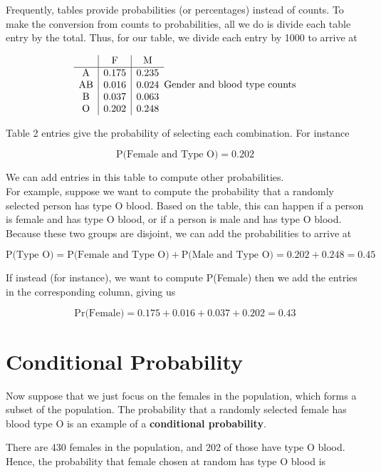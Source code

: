 \documentclass[
]{book}
\begin{document}
Frequently, tables provide probabilities (or percentages) instead of counts.
To make the conversion from counts to probabilities, all we do is divide each table entry by the total.
Thus, for our table, we divide each entry by 1000 to arrive at

\[
\begin{array}{c|c|c}
           & \mathrm{F} & \mathrm{M}\\ \hline
\mathrm{A} & 0.175 & 0.235 \\ 
\mathrm{AB} & 0.016 & 0.024 \\ 
\mathrm{B} & 0.037 & 0.063 \\ 
\mathrm{O} & 0.202 & 0.248 \\ 
\end{array}\\
\mbox{Gender and blood type counts}
\]

Table 2 entries give the probability of selecting each combination. For instance

\[
\mbox{P(Female and Type O)} = 0.202
\]

We can add entries in this table to compute other probabilities.\\
For example, suppose we want to compute the probability that a randomly selected person has type O blood.
Based on the table, this can happen if a person is female and has type O blood, or if a person is male and has type O blood.
Because these two groups are disjoint, we can add the probabilities to arrive at

\[
\mbox{P(Type O)} = \mbox{P(Female and Type O)} + \mbox{P(Male and Type O)}
= 0.202 + 0.248 = 0.45
\]

If instead (for instance), we want to compute P(Female) then we add the entries in the corresponding column, giving us

\[
\mbox{Pr(Female)} = 0.175 + 0.016 + 0.037 + 0.202 = 0.43 
\]

\hypertarget{conditional-probability}{%
\chapter{Conditional Probability}\label{conditional-probability}}

Now suppose that we just focus on the females in the population, which forms a subset of the population.
The probability that a randomly selected female has blood type O is an example of a \textbf{conditional probability}.

There are 430 females in the population, and 202 of those have type O blood.
Hence, the probability that female chosen at random has type O blood is
\end{document}
